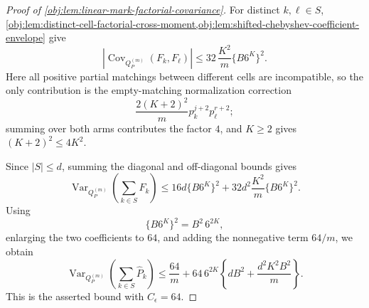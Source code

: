\begin{proof}[Proof of \cref{obj:lem:linear-mark-factorial-covariance}]
For distinct \(k,\ell\in S\), \cref{obj:lem:distinct-cell-factorial-cross-moment,obj:lem:shifted-chebyshev-coefficient-envelope} give
\[
\left|\operatorname{Cov}_{Q_P^{(m)}}(F_k,F_\ell)\right|
\le
32\,\frac{K^2}{m}\{B6^K\}^2 .
\]
Here all positive partial matchings between different cells are incompatible, so the only contribution is the empty-matching normalization correction
\[
\frac{2(K+2)^2}{m}p_k^{j+2}p_\ell^{r+2};
\]
summing over both arms contributes the factor \(4\), and \(K\ge2\) gives \((K+2)^2\le4K^2\).

Since \(|S|\le d\), summing the diagonal and off-diagonal bounds gives
\[
\operatorname{Var}_{Q_P^{(m)}}\!\left(\sum_{k\in S}F_k\right)
\le
16d\{B6^K\}^2
+
32d^2\frac{K^2}{m}\{B6^K\}^2 .
\]
Using
\[
\{B6^K\}^2=B^2\,6^{2K},
\]
enlarging the two coefficients to \(64\), and adding the nonnegative term \(64/m\), we obtain
\[
\operatorname{Var}_{Q_P^{(m)}}\!\left(\sum_{k\in S}\widehat P_k\right)
\le
\frac{64}{m}
+
64\,6^{2K}
\left\{
dB^2+\frac{d^2K^2B^2}{m}
\right\}.
\]
This is the asserted bound with \(C_\epsilon=64\).
\end{proof}
